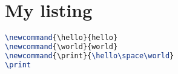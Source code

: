 \documentclass[
    load-dhbw-templates,
    print,                  %
    add-tocs-to-toc,
    debug,
    language = ngerman
]{iodhbwm}
\begin{document}
    
    \chapter{My listing}
        \blindtext
        
        \begin{lstlisting}[caption={Hello World},language=TeX]
\newcommand{\hello}{hello}
\newcommand{\world}{world}
\newcommand{\print}{\hello\space\world}
\print
        \end{lstlisting}
        
        \blindtext
\end{document}

